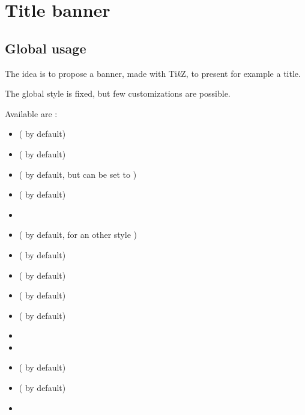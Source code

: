 \documentclass[english,11pt,a4paper]{article}
\providecommand\tikzlogo{Ti\textit{k}Z}
\let\TikZ\tikzlogo
\begin{document}
\pagebreak

\section{Title banner}

\subsection{Global usage}

The idea is to propose a banner, made with \TikZ, to present for example a title.

The global style is fixed, but few customizations are possible.

\begin{codehigh}[language=latex/latex3,style/main=teal!25,style/code=teal!25]
\end{codehigh}

\begin{demohigh}[language=latex/latex3,style/main=teal!25,style/code=teal!25]
\end{demohigh}

Available  are :

\begin{itemize}
	\item {} (\MontreCode{2.5em} by default)
	\item {} ( by default)
	\item {} (\MontreCode{2.75em} by default, but can be set to )
	\item {} ( by default)
	\item {}
	\item {} ( by default, for an other style )
	\item {} ( by default)
	\item {} ( by default)
	\item {} ( by default)
	\item {} ( by default)
	\item {}
	\item {}
	\item {} ( by default)
	\item {} (  by default)
	\item {}
\end{itemize}
\end{document}
